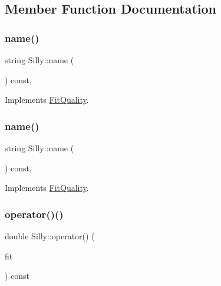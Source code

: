 \subsection{Member Function Documentation}
\mbox{\label{classSilly_a090ed776bc4cf29f2ad8802242090b59}} 
\subsubsection{\texorpdfstring{name()}{name()}\hspace{0.1cm}{\footnotesize\ttfamily [1/2]}}
{\footnotesize\ttfamily string Silly\+::name (\begin{DoxyParamCaption}{ }\end{DoxyParamCaption}) const\hspace{0.3cm}{\ttfamily [inline]}, {\ttfamily [virtual]}}



Implements \mbox{\hyperlink{classFitQuality_a3423e236f25d68cf822094b363a74780}{Fit\+Quality}}.

\mbox{\label{classSilly_a090ed776bc4cf29f2ad8802242090b59}} 
\subsubsection{\texorpdfstring{name()}{name()}\hspace{0.1cm}{\footnotesize\ttfamily [2/2]}}
{\footnotesize\ttfamily string Silly\+::name (\begin{DoxyParamCaption}{ }\end{DoxyParamCaption}) const\hspace{0.3cm}{\ttfamily [inline]}, {\ttfamily [virtual]}}



Implements \mbox{\hyperlink{classFitQuality_a3423e236f25d68cf822094b363a74780}{Fit\+Quality}}.

\mbox{\label{classSilly_a7da4b46c49f85b3dbf91bbdcd7299b2c}} 
\subsubsection{\texorpdfstring{operator()()}{operator()()}\hspace{0.1cm}{\footnotesize\ttfamily [1/2]}}
{\footnotesize\ttfamily double Silly\+::operator() (\begin{DoxyParamCaption}\item[{const \mbox{\hyperlink{classAvgFit}{Avg\+Fit}} \&}]{fit }\end{DoxyParamCaption}) const\hspace{0.3cm}{\ttfamily [virtual]}}



